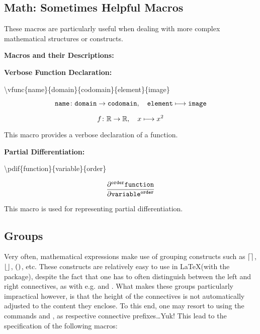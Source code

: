 \vspace{0.1in}

\subsection{Math: Sometimes Helpful Macros}

These macros are particularly useful when dealing with more complex mathematical structures or constructs.

\vspace{0.1in}

\noindent
\noindent
\textbf{Macros and their Descriptions:}

\vspace{0.5cm}

\noindent
\textbf{Verbose Function Declaration:}

\textbackslash vfunc\{name\}\{domain\}\{codomain\}\{element\}\{image\}

\[
\mathtt{name}\colon\mathtt{domain}\to\mathtt{codomain},\quad\mathtt{element}\longmapsto\mathtt{image}
\]

\[
f\colon\mathbb{R}\to\mathbb{R},\quad x\longmapsto x^2
\]

This macro provides a verbose declaration of a function.

\vspace{0.5cm}

\noindent
\textbf{Partial Differentiation:}

\textbackslash pdif\{function\}\{variable\}\{order\}

\[
\frac{\partial^{\mathtt{order}}\mathtt{function}}{\partial\mathtt{variable}^{\mathtt{order}}}
\]

This macro is used for representing partial differentiation.

\vspace{0.5cm}


\subsection{Groups}

Very often, mathematical expressions make use of grouping constructs such as
$\left\lceil{}\right\rceil$, $\left\lfloor{}\right\rfloor$, $\left({}\right)$, etc. These constructs are relatively easy to use
in \LaTeX (with the  package), despite the fact that one has to
often distinguish between the left and right connectives, as with e.g.
 and . What makes these groups particularly
impractical however, is that the height of the connectives is not automatically
adjusted to the content they enclose. To this end, one may resort to using the
commands  and , as respective connective
prefixes\dots Yuk!  This lead to the specification of the following macros:

